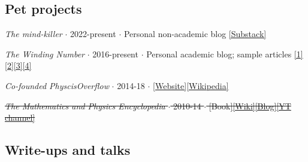 \documentclass{article}
\newcommand{\disown}[1]{\sout{#1}}
\newcommand{\archive}{\color{lightgray}}
\begin{document}
\subsection*{Pet projects}

\begin{itemize}

    \item \emph{The mind-killer} $\cdot$ 2022-present $\cdot$ Personal non-academic blog \href{https://copypasta.substack.com}{[Substack]}
    \item \emph{The Winding Number} $\cdot$ 2016-present $\cdot$ Personal academic blog; sample articles \href{https://thewindingnumber.blogspot.com/2019/10/sigma-fields-are-venn-diagrams.html}{[1]}\href{https://thewindingnumber.blogspot.com/2022/10/a-crash-course-on-mathematical-logic.html}{[2]}\href{https://thewindingnumber.blogspot.com/2020/08/hacking-evidential-decision-theory.html}{[3]}\href{https://thewindingnumber.blogspot.com/2019/05/whats-with-e-1x-on-smooth-non-analytic.html}{[4]}

{\archive

    \item \emph{Co-founded PhyscisOverflow} $\cdot$ 2014-18 $\cdot$ \href{https://physicsoverflow.org}{[Website]}\href{https://en.wikipedia.org/wiki/PhysicsOverflow}{[Wikipedia]}

    \item \disown{\emph{The Mathematics and Physics Encyclopedia} $\cdot$ 2010-14 $\cdot$ [Book]\href{https://psiepsilon.wikia.com/}{[Wiki]}\href{https://psiepsilon.wordpress.com/}{[Blog]}\href{https://www.youtube.com/user/abhi99ps}{[YT channel]}}

}

\end{itemize}

\subsection*{Write-ups and talks}
\end{document}
